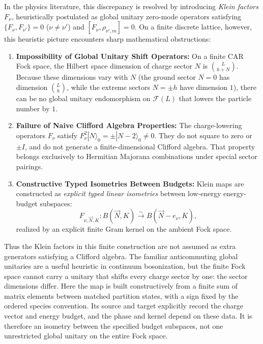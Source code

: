 In the physics literature, this discrepancy is resolved by introducing \emph{Klein factors} $F_\nu$, heuristically postulated as global unitary zero-mode operators satisfying $\{F_\nu, F_{\nu'}\} = 0$ ($\nu \neq \nu'$) and $[F_\nu, \rho_{\nu', m}] = 0$. On a finite discrete lattice, however, this heuristic picture encounters sharp mathematical obstructions:
\begin{enumerate}
    \item \textbf{Impossibility of Global Unitary Shift Operators:} On a finite CAR Fock space, the Hilbert space dimension of charge sector $N$ is $\binom{L}{h+N}$. Because these dimensions vary with $N$ (the ground sector $N=0$ has dimension $\binom{L}{h}$, while the extreme sectors $N = \pm h$ have dimension $1$), there can be no global unitary endomorphism on $\mathcal{F}(L)$ that lowers the particle number by $1$.
    \item \textbf{Failure of Naive Clifford Algebra Properties:} The charge-lowering operators $F_\nu$ satisfy $F_\nu^2 |N\rangle_0 = \pm |N-2\rangle_0 \neq 0$. They do not square to zero or $\pm I$, and do not generate a finite-dimensional Clifford algebra. That property belongs exclusively to Hermitian Majorana combinations under special sector pairings.
    \item \textbf{Constructive Typed Isometries Between Budgets:} Klein maps are constructed as \emph{explicit typed linear isometries} between low-energy energy-budget subspaces:
    \begin{equation}
    F_{\nu, \vec{N}, K} : B(\vec{N}, K) \xrightarrow{\sim} B(\vec{N} - e_\nu, K),
    \end{equation}
    realized by an explicit finite Gram kernel on the ambient Fock space.
\end{enumerate}

Thus the Klein factors in this finite construction are not assumed as extra generators satisfying a Clifford algebra. The familiar anticommuting global unitaries are a useful heuristic in continuum bosonization, but the finite Fock space cannot carry a unitary that shifts every charge sector by one: the sector dimensions differ. Here the map is built constructively from a finite sum of matrix elements between matched partition states, with a sign fixed by the ordered species convention. Its source and target explicitly record the charge vector and energy budget, and the phase and kernel depend on these data. It is therefore an isometry between the specified budget subspaces, not one unrestricted global unitary on the entire Fock space.


